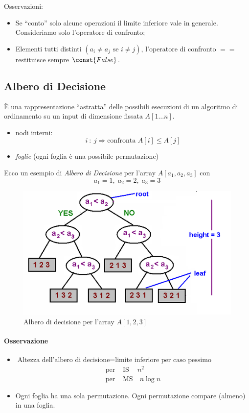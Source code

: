 Osservazioni:
\begin{itemize}[label=$\rightarrow$]
    \item Se ``conto'' solo alcune operazioni il limite inferiore
    vale in generale. Consideriamo solo l'operatore di confronto;
    \item Elementi tutti distinti $(a_i \neq a_j \text{ se } i \neq j)$,
    l'operatore di confronto $==$ restituisce sempre $\const{False}$.
\end{itemize}

\subsection{Albero di Decisione}

È una rappresentazione ``astratta'' delle possibili esecuzioni di un 
algoritmo di ordinamento su un input di dimensione fissata $A[1 \dots n]$.

\begin{itemize}[label=$\rightarrow$]
    \item nodi interni: 
    $$i \ : \ j \Rightarrow \text{confronta } A[i] \leq A[j]$$
    \item \emph{foglie} (ogni foglia è una possibile permutazione)
\end{itemize}

Ecco un esempio di \emph{Albero di Decisione} per l'array $A[a_1,a_2,a_3]$ 
con 
$$a_1 = 1, \; a_2 = 2, \; a_3 = 3$$
\clearpage
\begin{figure} 
    \centering
    \includegraphics[width=\textwidth]{img/decision-tree.png}
    \caption{Albero di decisione per l'array $A[1,2,3]$}
\end{figure}

\paragraph{Osservazione}
\begin{itemize}
	\item $ \text{Altezza dell'albero di decisione} = \text{limite inferiore per caso pessimo}$
	\begin{align*}
	    \text{per }& \text{IS} \ \quad n^2 \\
	    \text{per }& \text{MS} \quad n \log n
	\end{align*}
	\item Ogni foglia ha una sola permutazione. Ogni permutazione compare (almeno) in una foglia.
\end{itemize}

